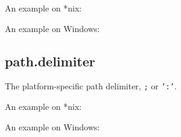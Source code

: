 An example on *nix:

\begin{Shaded}
\begin{Highlighting}[]
\NormalTok{(}\NormalTok{)}
\NormalTok{[}\NormalTok{, }\NormalTok{, }\NormalTok{]}
\end{Highlighting}
\end{Shaded}

An example on Windows:

\begin{Shaded}
\begin{Highlighting}[]
\NormalTok{(}\NormalTok{)}
\NormalTok{[}\NormalTok{, }\NormalTok{, }\NormalTok{]}
\end{Highlighting}
\end{Shaded}

\subsection{path.delimiter}

The platform-specific path delimiter, \texttt{;} or \texttt{':'}.

An example on *nix:

\begin{Shaded}
\begin{Highlighting}[]
\NormalTok{(}\NormalTok{)}

\NormalTok{(}\NormalTok{)}
\NormalTok{[}\NormalTok{, }\NormalTok{, }\NormalTok{, }\NormalTok{, }\NormalTok{]}
\end{Highlighting}
\end{Shaded}

An example on Windows:

